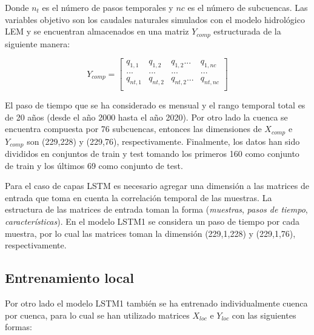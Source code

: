   \vspace{5mm}
  
  
  Donde $n_t$ es el número de pasos temporales y $nc$ es el número de subcuencas. 
  Las variables objetivo son los caudales naturales simulados con el modelo hidrológico LEM y 
  se encuentran almacenados en una matriz $Y_{comp}$ estructurada de la siguiente manera:
  
  \vspace{5mm}
  
  \begin{equation*}
      Y_{comp}= 
      \begin{bmatrix}
          q_{1,1} & q_{1,2} & q_{1,2} ... &  q_{1,nc} \\
          ... & ... & ... &  ... \\
          q_{nt,1} & q_{nt,2} & q_{nt,2} ... &  q_{nt,nc} \\
          \end{bmatrix}
  \end{equation*}
  
  \vspace{5mm}
  
  El paso  de tiempo que se ha considerado es mensual y el rango temporal total es de 20 años 
  (desde el año 2000 hasta el año 2020). Por otro lado la cuenca se encuentra compuesta por 76 subcuencas, 
  entonces las dimensiones de $X_{comp}$ e $Y_{comp}$ son (229,228) y (229,76), respectivamente.
  Finalmente, los datos han sido divididos en conjuntos de train y test tomando los primeros 160 
  como conjunto de train y los últimos 69 como conjunto de test.

  Para el caso de capas LSTM es necesario agregar una dimensión a las matrices de entrada que toma en cuenta la correlación temporal de las muestras. 
  La estructura de las matrices de entrada toman la forma (\textit{muestras}, \textit{pasos de tiempo}, \textit{características}). En el modelo 
  LSTM1 se considera un paso de tiempo por cada muestra, por lo cual  las matrices toman 
  la dimensión (229,1,228) y (229,1,76), respectivamente.

\subsection{Entrenamiento local}
 Por otro lado el modelo LSTM1 también se ha entrenado individualmente cuenca por cuenca, para lo cual se han utilizado
matrices $X_{loc}$ e $Y_{loc}$ con las siguientes formas:
\vspace{5mm}

